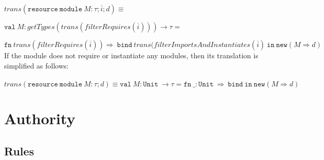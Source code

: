 \documentclass{llncs}
\newcommand{\keywadj}[1]{\mathtt{#1}}
\newcommand{\keyw}[1]{\keywadj{#1}~}
\begin{document}
\noindent$trans(\keyw{resource} \keyw{module} M : \tau; \overline{i}; d) \equiv$

$\keyw{val} M : getTypes(trans(filterRequires(\overline{i}))) \rightarrow \tau = $

$\keyw{fn} trans(filterRequires(\overline{i})) \Rightarrow~\keyw{bind} trans(filterImportsAndInstantiates(\overline{i})~\keyw{in} \keywadj{new}(M \Rightarrow d)$\\

\noindent If the module does not require or instantiate any modules, then its translation is simplified as follows:
\\\\
\noindent$trans(\keyw{resource} \keyw{module} M : \tau; d) \equiv \keyw{val} M : \keyw{Unit} \rightarrow \tau = \keyw{fn} \_ : \keyw{Unit} \Rightarrow~\keyw{bind} \keyw{in} \keywadj{new}(M \Rightarrow d)$


\newpage

\section{Authority}

\subsection{Rules}
\end{document}

